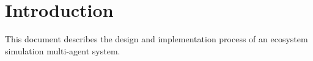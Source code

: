 
\section{Introduction}

This document describes the design and implementation process of an ecosystem simulation multi-agent system.